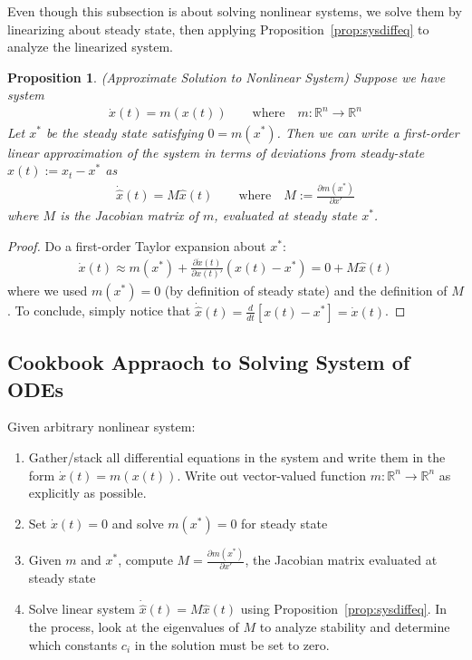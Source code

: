 \documentclass[12pt]{book}
\numberwithin{equation}{section} %
\theoremstyle{plain}
\newtheorem{prop}[thm]{Proposition}
\theoremstyle{definition}
\theoremstyle{remark}
\newcommand{\ra}{\rightarrow}
\newcommand{\dx}{\dot{x}}
\newcommand{\Rn}{\mathbb{R}^n}
\begin{document}
Even though this subsection is about solving nonlinear systems, we solve
them by linearizing about steady state, then applying
Proposition~\ref{prop:sysdiffeq} to analyze the linearized system.

\begin{prop}\emph{(Approximate Solution to Nonlinear System)}
Suppose we have system
\begin{align*}
  \dx(t) = m(x(t))
  \qquad\text{where} \quad
  m:\Rn\ra\Rn
\end{align*}
Let $x^*$ be the steady state satisfying $0=m(x^*)$.
Then we can write a first-order linear approximation of the system in
terms of deviations from steady-state $\hat{x}(t):=x_t-x^*$ as
\begin{align*}
  \dot{\hat{x}}(t) = M\hat{x}(t)
  \qquad\text{where}\quad
  M:= \frac{\partial m(x^*)}{\partial x'}
\end{align*}
where $M$ is the Jacobian matrix of $m$, evaluated at steady state
$x^*$.
\end{prop}
\begin{proof}
Do a first-order Taylor expansion about $x^*$:
\begin{align*}
  \dx(t)\approx
  m(x^*)
  +
  \frac{\partial \dx(t)}{\partial x(t)'}
  (x(t)-x^*)
  =
  0 + M\hat{x}(t)
\end{align*}
where we used $m(x^*)=0$ (by definition of steady state)
and the definition of $M$. To conclude, simply notice that
$\dot{\hat{x}}(t)=\frac{d}{dt}[x(t)-x^*]=\dot{x}(t)$.
\end{proof}

\subsection{Cookbook Appraoch to Solving System of ODEs}

Given arbitrary nonlinear system:
\begin{enumerate}[label=(\roman*)]
  \item Gather/stack all differential equations in the system and write
    them in the form $\dx(t)=m(x(t))$.
    Write out vector-valued function $m:\Rn\ra\Rn$ as explicitly as
    possible.
  \item Set $\dx(t)=0$ and solve $m(x^*)=0$ for steady state
  \item Given $m$ and $x^*$, compute $M=\frac{\partial m(x^*)}{\partial
    x'}$, the Jacobian matrix evaluated at steady state
  \item Solve linear system $\dot{\hat{x}}(t)=M\hat{x}(t)$
    using Proposition~\ref{prop:sysdiffeq}.
    In the process, look at the eigenvalues of $M$ to analyze stability
    and determine which constants $c_i$ in the solution must be set to
    zero.
\end{enumerate}
\end{document}
